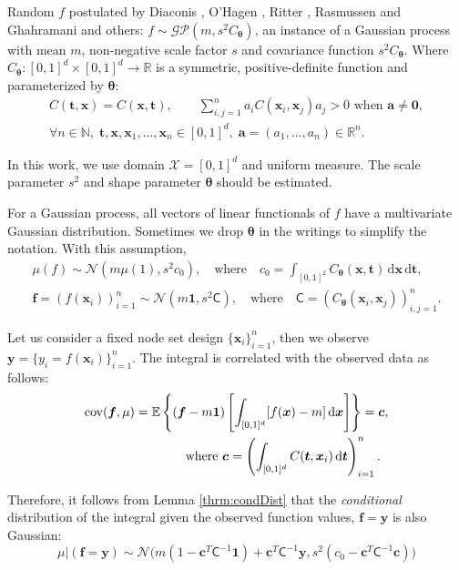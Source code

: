 \documentclass[smallextended]{svjour3}       %
\newcommand{\bm}[1]{\boldsymbol{#1}}
\newcommand{\dif}[1]{\text{d}{#1}}
\newcommand{\D}[1]{\text{d}{#1}}
\newcommand{\Ex}{\mathbb{E}}
\newcommand{\vtheta}{{\bm{\theta}}}
\newcommand{\va}{\bm{a}}
\newcommand{\vc}{\bm{c}}
\newcommand{\vf}{\bm{f}}
\newcommand{\vt}{\bm{t}}
\newcommand{\vx}{\bm{x}}
\newcommand{\vy}{\bm{y}}
\newcommand{\vzero}{\bm{0}}
\newcommand{\vone}{\bm{1}}
\newcommand{\mC}{\mathsf{C}}
\newcommand{\cov}{{\textup{cov}}}
\newcommand{\calN}{\mathcal{N}}
\begin{document}
Random $f$ postulated by Diaconis \cite{DiaconisBayesian}, O'Hagen \cite{HagenBayes}, Ritter \cite{RiterAverage}, Rasmussen and Ghahramani \cite{RasmussenBayesian} and others: $f \sim \mathcal{GP}(m,s^2 C_\vtheta)$, an instance of a Gaussian process with mean $m$, non-negative scale factor $s$ and covariance function $s^2C_\vtheta$. Where $C_\vtheta: [0,1]^d \times [0,1]^d \to \mathbb{R} $ is a symmetric, positive-definite function and parameterized by $\vtheta$:
\begin{multline} \label{FJH:eq:CondPosDef}
C(\vt,\vx)  = C(\vx, \vt),  \qquad \sum_{i,j = 1}^n a_iC(\vx_i,\vx_j) a_j  
> 0 \text{ when } \va \ne \vzero, \\
\forall n\in \mathbb{N}, \; \vt, \vx, \vx_1, \ldots, \vx_n \in [0,1]^d, \; \va = (a_1, \ldots, a_n) \in \mathbb{R}^n.
\end{multline}

In this work, we use domain $\mathcal{X} = [0,1]^d$ and uniform measure.  The scale parameter $s^2$ and shape parameter $\vtheta$ should be estimated.

For a Gaussian process, all vectors of linear functionals of $f$ have a multivariate Gaussian distribution. Sometimes we drop $\vtheta$ in the writings to simplify the notation. With this assumption,
\begin{subequations}
\begin{align}
\mu(f) \sim \calN(m \mu(1), s^2 c_0), 
\quad\text{where}\quad
c_0 = \int_{[0,1]^2} C_\vtheta(\vx,\vt) \, \dif{\vx} \, \dif{\vt},
\\
\label{eqn:fGaussDist}
\vf  = \left( f(\vx_i)\right)_{i=1}^n \sim \calN(m \vone, s^2 \mC), 
\quad\text{where}\quad
\mC = \left(  C_\vtheta(\vx_i,\vx_j)  \right)_{i,j=1}^n.
\end{align}
\end{subequations}

Let us consider a fixed node set design $\{ \vx_i \}_{i=1}^n$, then we observe $\vy = \{y_i = f(\vx_i) \}_{i=1}^n$. 
The integral is correlated with the observed data as follows:
\begin{align*}
\cov(\vf, \mu) &= \Ex\left \{(\vf - m \vone) \left [\int_{[0,1]^d} [f(\vx) - m ] \, \D \vx  \right] \right\}  = \vc, 
\\
& \qquad \qquad \text{where } \vc = \left(  \int_{[0,1]^d} C(\vt,\vx_i) \, \D \vt \right)_{i=1}^n.
\end{align*}




Therefore,  it follows from Lemma \ref{thrm:condDist} that the \emph{conditional} distribution of the integral given the observed function values, $\vf = \vy$ is also Gaussian:
\begin{equation} \label{eqn:condInteg}
\mu | (\vf = \vy) \sim \calN \bigl(m (1 - \vc^T \mC^{-1} \vone)  + \vc^T \mC^{-1} \vy, s^2(c_0  -\vc ^T \mC^{-1} \vc) \bigr)
\end{equation}
\end{document}
